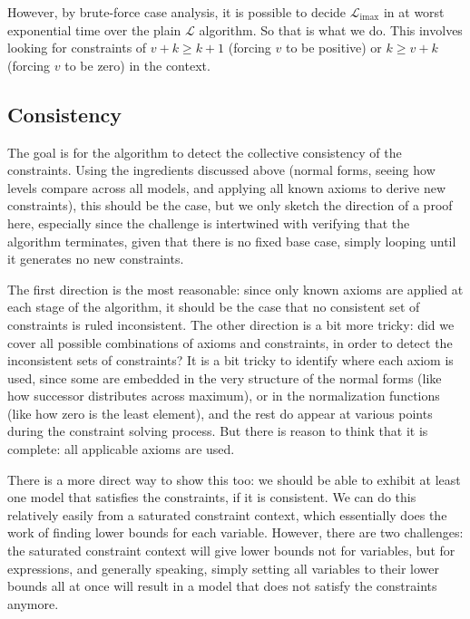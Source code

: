 \documentclass[11pt, twoside, reqno]{book}
\DeclareMathOperator{\imax}{imax}
\begin{document}
However, by brute-force case analysis, it is possible to decide \(\mathcal{L}_{\imax}\) in at worst exponential time over the plain \(\mathcal{L}\) algorithm.
So that is what we do.
This involves looking for constraints of \(v+k \ge k+1\) (forcing \(v\) to be positive) or \(k \ge v+k\) (forcing \(v\) to be zero) in the context.


\subsection{Consistency}
The goal is for the algorithm to detect the collective consistency of the constraints.
Using the ingredients discussed above (normal forms, seeing how levels compare across all models, and applying all known axioms to derive new constraints), this should be the case, but we only sketch the direction of a proof here, especially since the challenge is intertwined with verifying that the algorithm terminates, given that there is no fixed base case, simply looping until it generates no new constraints.

The first direction is the most reasonable: since only known axioms are applied at each stage of the algorithm, it should be the case that no consistent set of constraints is ruled inconsistent.
The other direction is a bit more tricky: did we cover all possible combinations of axioms and constraints, in order to detect the inconsistent sets of constraints?
It is a bit tricky to identify where each axiom is used, since some are embedded in the very structure of the normal forms (like how successor distributes across maximum), or in the normalization functions (like how zero is the least element), and the rest do appear at various points during the constraint solving process.
But there is reason to think that it is complete: all applicable axioms are used.

There is a more direct way to show this too: we should be able to exhibit at least one model that satisfies the constraints, if it is consistent.
We can do this relatively easily from a saturated constraint context, which essentially does the work of finding lower bounds for each variable.
However, there are two challenges: the saturated constraint context will give lower bounds not for variables, but for expressions, and generally speaking, simply setting all variables to their lower bounds all at once will result in a model that does not satisfy the constraints anymore.
\end{document}
